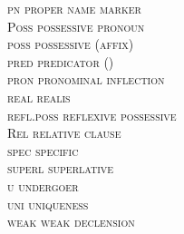 \documentclass[output=collectionpaper]{langsci/langscibook}
\begin{document}
\begin{multicols}{2}
\begin{tabbing}
\scshape pn	\>	proper name marker	\\
\normalfont Poss	\>	possessive pronoun	\\
\scshape poss	\>	possessive (affix)	\\
\scshape pred	\>	predicator ()	\\
\scshape pron	\>	pronominal inflection	\\
\scshape real	\>	realis	\\
\scshape refl.poss	\>	reflexive possessive	\\
\normalfont Rel	\>	relative clause	\\
\scshape spec	\>	specific	\\
\scshape superl	\>	superlative	\\
\scshape u	\>	undergoer	\\
\scshape uni	\>	uniqueness	\\
\scshape weak	\>	weak declension	\\
\end{tabbing}
\end{multicols}

\nocite{Iraya1991}
\nocite{KahuaBible2011}
\nocite{NalcaNT}
\nocite{UnaNT2007}

{\sloppy\printbibliography[heading=subbibliography,title={Translations of New Testaments used},keyword=bible]}

{\sloppy\printbibliography[heading=subbibliography,notkeyword=this,notkeyword=bible]}
\end{document}
